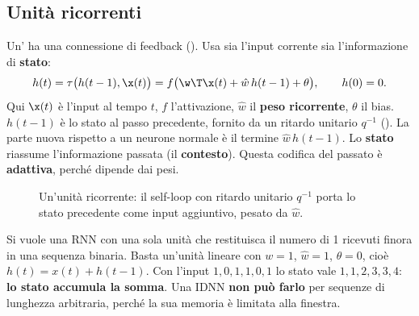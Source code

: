 \subsection{Unità ricorrenti}

Un' ha una connessione di feedback (). Usa sia l'input corrente sia
l'informazione di \textbf{stato}:
\begin{equation}\label{eq:unita-ricorrente}
h(t) = \tau\big(h(t-1),\x(t)\big) = f\big(\w\T\x(t) + \hat w\,h(t-1) + \theta\big),\qquad h(0)=0.
\end{equation}
Qui $\x(t)$ è l'input al tempo $t$, $f$ l'attivazione, $\hat w$ il \textbf{peso ricorrente}, $\theta$ il bias. $h(t-1)$
è lo stato al passo precedente, fornito da un ritardo unitario $q^{-1}$ (). La parte
nuova rispetto a un neurone normale è il termine $\hat w\,h(t-1)$. Lo \textbf{stato} riassume l'informazione passata
(il \textbf{contesto}). Questa codifica del passato è \textbf{adattiva}, perché dipende dai pesi.

\begin{figure}[ht]
\centering
{}
\caption{Un'unità ricorrente: il self-loop con ritardo unitario $q^{-1}$ porta lo stato precedente come input
aggiuntivo, pesato da $\hat w$.}
\label{fig:unita-ricorrente}
\end{figure}

\begin{esempio}
Si vuole una RNN con una sola unità che restituisca il numero di 1 ricevuti finora in una sequenza binaria. Basta
un'unità lineare con $w=1$, $\hat w=1$, $\theta=0$, cioè $h(t) = x(t) + h(t-1)$. Con l'input $1,0,1,1,0,1$ lo stato
vale $1,1,2,3,3,4$: \textbf{lo stato accumula la somma}. Una IDNN \textbf{non può farlo} per sequenze di lunghezza
arbitraria, perché la sua memoria è limitata alla finestra.
\end{esempio}

